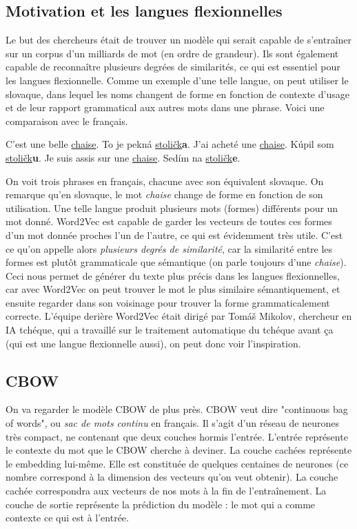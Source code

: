 \documentclass[11pt, a4paper]{report}
\begin{document}
\subsection{Motivation et les langues flexionnelles}
\cite{word2vec-original} Le but des chercheurs était de trouver un modèle qui serait capable de s'entraîner sur un corpus 
d'un milliards de mot (en ordre de grandeur). Ils sont également capable de reconnaître 
plusieurs degrées de similarités, ce qui est essentiel pour les langues flexionnelle. 
Comme un exemple d'une telle langue, on peut utiliser le slovaque, dans lequel les noms 
changent de forme en fonction de contexte d'usage et de leur rapport grammatical aux autres 
mots dans une phrase. Voici une comparaison avec le français.

\begin{center}
  C'est une belle \underline{chaise}. To je pekná \underline{stoličk}\textbf{a}. \newline
  J'ai acheté une \underline{chaise}. Kúpil som \underline{stoličk}\textbf{u}. \newline
  Je suis assis sur une \underline{chaise}. Sedím na \underline{stoličk}\textbf{e}. \newline
\end{center}

On voit trois phrases en français, chacune avec son équivalent slovaque. On remarque qu'en 
slovaque, le mot \textit{chaise} change de forme en fonction de son utilisation. Une telle 
langue produit plusieurs mots (formes) différents pour un mot donné. Word2Vec est capable 
de garder les vecteurs de toutes ces formes d'un mot donnée proches l'un de l'autre, 
ce qui est évidemment très utile. C'est ce qu'on appelle alors \textit{plusieurs degrés 
de similarité}, car la similarité entre les formes est plutôt grammaticale que 
sémantique (on parle toujours d'une \textit{chaise}). Ceci nous permet de générer du texte 
plus précis dans les langues flexionnelles, car avec Word2Vec on peut trouver le mot le plus 
similaire sémantiquement, et ensuite regarder dans son voisinage pour trouver la forme 
grammaticalement correcte. L'équipe derière Word2Vec était dirigé par Tomáš Mikolov, 
chercheur en IA tchéque, qui a travaillé sur le traitement automatique du tchéque avant ça
(qui est une langue flexionnelle aussi), on peut donc voir l'inspiration. 

\subsection{CBOW}
On va regarder le modèle CBOW de plus près. CBOW veut dire "continuous bag of words", ou 
\textit{sac de mots continu} en français. Il s'agit d'un réseau de neurones très compact, 
ne contenant que deux couches hormis l'entrée. L'entrée représente le contexte du mot que 
le CBOW cherche à deviner. La couche cachées représente le embedding lui-même. Elle est constituée
de quelques centaines de neurones (ce nombre correspond à la dimension des vecteurs qu'on veut 
obtenir). La couche 
cachée correspondra aux vecteurs de nos mots à la fin de l'entraînement. La couche de sortie 
représente la prédiction du modèle : le mot qui a comme contexte ce qui est à l'entrée. 
\end{document}
